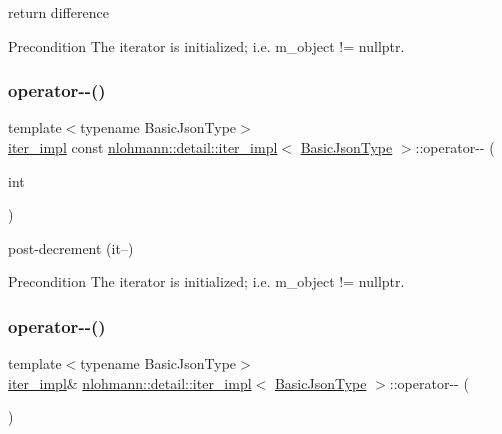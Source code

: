 return difference 

\begin{DoxyPrecond}{Precondition}
The iterator is initialized; i.\+e. {\ttfamily m\+\_\+object != nullptr}. 
\end{DoxyPrecond}
\mbox{\label{classnlohmann_1_1detail_1_1iter__impl_a1fc43e764467b8ea4a4cdd01f629d757}} 
\subsubsection{\texorpdfstring{operator-\/-\/()}{operator--()}\hspace{0.1cm}{\footnotesize\ttfamily [1/2]}}
{\footnotesize\ttfamily template$<$typename Basic\+Json\+Type$>$ \\
\hyperlink{classnlohmann_1_1detail_1_1iter__impl}{iter\+\_\+impl} const \hyperlink{classnlohmann_1_1detail_1_1iter__impl}{nlohmann\+::detail\+::iter\+\_\+impl}$<$ \hyperlink{classnlohmann_1_1detail_1_1iter__impl_abf18f18793f84b0222aebb5a2a87da7a}{Basic\+Json\+Type} $>$\+::operator-\/-\/ (\begin{DoxyParamCaption}\item[{int}]{ }\end{DoxyParamCaption})\hspace{0.3cm}{\ttfamily [inline]}}



post-\/decrement (it--) 

\begin{DoxyPrecond}{Precondition}
The iterator is initialized; i.\+e. {\ttfamily m\+\_\+object != nullptr}. 
\end{DoxyPrecond}
\mbox{\label{classnlohmann_1_1detail_1_1iter__impl_a84e689fb581d651d130039f7cb81494a}} 
\subsubsection{\texorpdfstring{operator-\/-\/()}{operator--()}\hspace{0.1cm}{\footnotesize\ttfamily [2/2]}}
{\footnotesize\ttfamily template$<$typename Basic\+Json\+Type$>$ \\
\hyperlink{classnlohmann_1_1detail_1_1iter__impl}{iter\+\_\+impl}\& \hyperlink{classnlohmann_1_1detail_1_1iter__impl}{nlohmann\+::detail\+::iter\+\_\+impl}$<$ \hyperlink{classnlohmann_1_1detail_1_1iter__impl_abf18f18793f84b0222aebb5a2a87da7a}{Basic\+Json\+Type} $>$\+::operator-\/-\/ (\begin{DoxyParamCaption}{ }\end{DoxyParamCaption})\hspace{0.3cm}{\ttfamily [inline]}}



